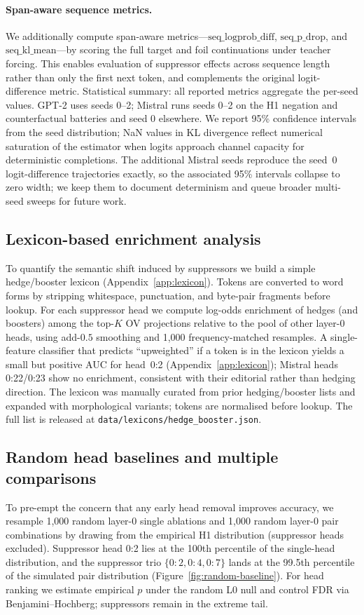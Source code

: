 \paragraph{Span-aware sequence metrics.}
We additionally compute span-aware metrics---$\mathrm{seq\_logprob\_diff}$, $\mathrm{seq\_p\_drop}$, and $\mathrm{seq\_kl\_mean}$---by scoring the full target and foil continuations under teacher forcing.
This enables evaluation of suppressor effects across sequence length rather than only the first next token, and complements the original logit-difference metric.
Statistical summary: all reported metrics aggregate the per-seed values. GPT-2 uses seeds 0–2; Mistral runs seeds 0–2 on the H1 negation and counterfactual batteries and seed 0 elsewhere. We report 95\% confidence intervals from the seed distribution; NaN values in KL divergence reflect numerical saturation of the estimator when logits approach channel capacity for deterministic completions.
The additional Mistral seeds reproduce the seed~0 logit-difference trajectories exactly, so the associated 95\% intervals collapse to zero width; we keep them to document determinism and queue broader multi-seed sweeps for future work.

\subsection{Lexicon-based enrichment analysis}
To quantify the semantic shift induced by suppressors we build a simple hedge/booster lexicon (Appendix~\ref{app:lexicon}).
Tokens are converted to word forms by stripping whitespace, punctuation, and byte-pair fragments before lookup.
For each suppressor head we compute log-odds enrichment of hedges (and boosters) among the top-$K$ OV projections relative to the pool of other layer-0 heads, using add-$0.5$ smoothing and 1{,}000 frequency-matched resamples.
A single-feature classifier that predicts ``upweighted'' if a token is in the lexicon yields a small but positive AUC for head~0:2 (Appendix~\ref{app:lexicon}); Mistral heads 0:22/0:23 show no enrichment, consistent with their editorial rather than hedging direction.
 The lexicon was manually curated from prior hedging/booster lists and expanded with morphological variants; tokens are normalised before lookup. The full list is released at \texttt{data/lexicons/hedge\_booster.json}.

\subsection{Random head baselines and multiple comparisons}
To pre-empt the concern that any early head removal improves accuracy, we resample 1{,}000 random layer-0 single ablations and 1{,}000 random layer-0 pair combinations by drawing from the empirical H1 distribution (suppressor heads excluded).
Suppressor head 0:2 lies at the 100th percentile of the single-head distribution, and the suppressor trio $\{0{:}2,0{:}4,0{:}7\}$ lands at the 99.5th percentile of the simulated pair distribution (Figure~\ref{fig:random-baseline}). For head ranking we estimate empirical $p$ under the random L0 null and control FDR via Benjamini–Hochberg; suppressors remain in the extreme tail.

